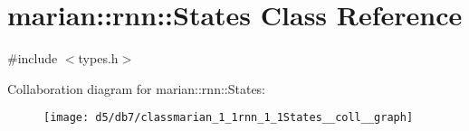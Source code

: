 \hypertarget{classmarian_1_1rnn_1_1States}{}\section{marian\+:\+:rnn\+:\+:States Class Reference}
\label{classmarian_1_1rnn_1_1States}


{\ttfamily \#include $<$types.\+h$>$}



Collaboration diagram for marian\+:\+:rnn\+:\+:States\+:
\nopagebreak
\begin{figure}[H]
\begin{center}
\leavevmode
\texttt{[image: d5/db7/classmarian\_1\_1rnn\_1\_1States\_\_coll\_\_graph]}
\end{center}
\end{figure}
